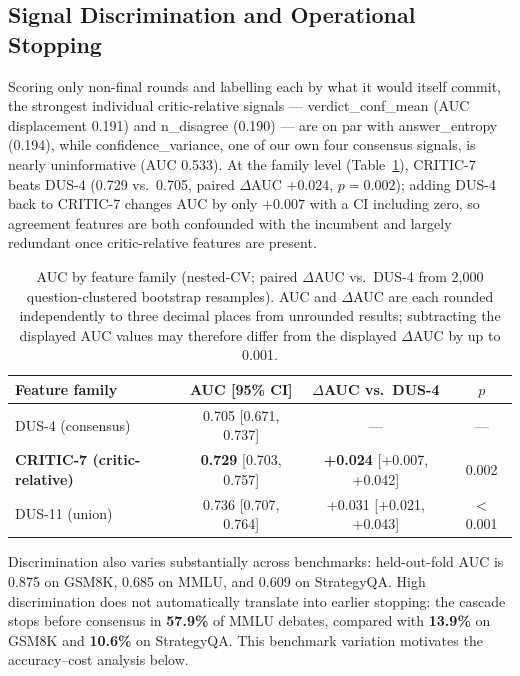 \documentclass{llncs}
\begin{document}
\subsection{Signal Discrimination and Operational Stopping}
\label{sec:discrimination}

Scoring only non-final rounds and labelling each by what it would itself commit, the strongest individual critic-relative signals --- verdict\_conf\_mean (AUC displacement 0.191) and n\_disagree (0.190) --- are on par with answer\_entropy (0.194), while confidence\_variance, one of our own four consensus signals, is nearly uninformative (AUC 0.533). At the family level (Table~\ref{tab:auc_merged}), CRITIC-7 beats DUS-4 (0.729 vs.\ 0.705, paired $\Delta$AUC $+0.024$, $p=0.002$); adding DUS-4 back to CRITIC-7 changes AUC by only $+0.007$ with a CI including zero, so agreement features are both confounded with the incumbent and largely redundant once critic-relative features are present.

\begin{table}[t]
\caption{AUC by feature family (nested-CV; paired $\Delta$AUC vs.\ DUS-4 from 2,000 question-clustered bootstrap resamples). AUC and $\Delta$AUC are each rounded independently to three decimal places from unrounded results; subtracting the displayed AUC values may therefore differ from the displayed $\Delta$AUC by up to 0.001.}
\label{tab:auc_merged}
\centering
\begin{tabular}{@{}lccc@{}}
\toprule
\textbf{Feature family} & \textbf{AUC [95\% CI]} & \textbf{$\Delta$AUC vs.\ DUS-4} & \textbf{$p$} \\
\midrule
DUS-4 (consensus) & 0.705 [0.671, 0.737] & --- & --- \\
\textbf{CRITIC-7 (critic-relative)} & \textbf{0.729} [0.703, 0.757] & \textbf{+0.024} [+0.007, +0.042] & 0.002 \\
DUS-11 (union) & 0.736 [0.707, 0.764] & +0.031 [+0.021, +0.043] & $<$0.001 \\
\bottomrule
\end{tabular}
\end{table}

Discrimination also varies substantially across benchmarks: held-out-fold AUC is 0.875 on GSM8K, 0.685 on MMLU, and 0.609 on StrategyQA. High discrimination does not automatically translate into earlier stopping: the cascade stops before consensus in \textbf{57.9\%} of MMLU debates, compared with \textbf{13.9\%} on GSM8K and \textbf{10.6\%} on StrategyQA. This benchmark variation motivates the accuracy--cost analysis below.
\end{document}
